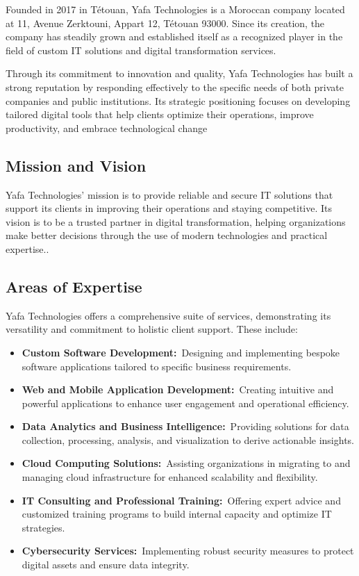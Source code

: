 Founded in 2017 in Tétouan, Yafa Technologies is a Moroccan company located at 11, Avenue Zerktouni, Appart 12, Tétouan 93000. Since its creation, the company has steadily grown and established itself as a recognized player in the field of custom IT solutions and digital transformation services.

Through its commitment to innovation and quality, Yafa Technologies has built a strong reputation by responding effectively to the specific needs of both private companies and public institutions. Its strategic positioning focuses on developing tailored digital tools that help clients optimize their operations, improve productivity, and embrace technological change
    \subsection{Mission and Vision}

Yafa Technologies' mission is to provide reliable and secure IT solutions that support its clients in improving their operations and staying competitive. Its vision is to be a trusted partner in digital transformation, helping organizations make better decisions through the use of modern technologies and practical expertise..
    \subsection{ Areas of Expertise}

 Yafa Technologies offers a comprehensive suite of services, demonstrating its versatility and commitment to holistic client support. These include:
    \begin{itemize}
        \item \textbf{Custom Software Development:} Designing and implementing bespoke software applications tailored to specific business requirements.
        \item \textbf{Web and Mobile Application Development:} Creating intuitive and powerful applications to enhance user engagement and operational efficiency.
        \item \textbf{Data Analytics and Business Intelligence:} Providing solutions for data collection, processing, analysis, and visualization to derive actionable insights.
        \item \textbf{Cloud Computing Solutions:} Assisting organizations in migrating to and managing cloud infrastructure for enhanced scalability and flexibility.
        \item \textbf{IT Consulting and Professional Training:} Offering expert advice and customized training programs to build internal capacity and optimize IT strategies.
        \item \textbf{Cybersecurity Services:} Implementing robust security measures to protect digital assets and ensure data integrity.
    \end{itemize}









